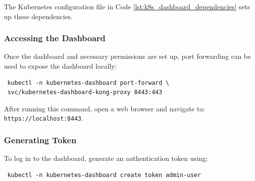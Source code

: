 The Kubernetes configuration file in Code \ref{lst:k8s_dashboard_dependencies} sets up these dependencies.


\subsubsection{Accessing the Dashboard}
Once the dashboard and necessary permissions are set up, port forwarding can be used to expose the dashboard locally:
\begin{verbatim}
 kubectl -n kubernetes-dashboard port-forward \
 svc/kubernetes-dashboard-kong-proxy 8443:443
\end{verbatim}

After running this command, open a web browser and navigate to: \texttt{https://localhost:8443}.

\subsubsection{Generating Token}
To log in to the dashboard, generate an authentication token using:
\begin{verbatim}
 kubectl -n kubernetes-dashboard create token admin-user
\end{verbatim}
